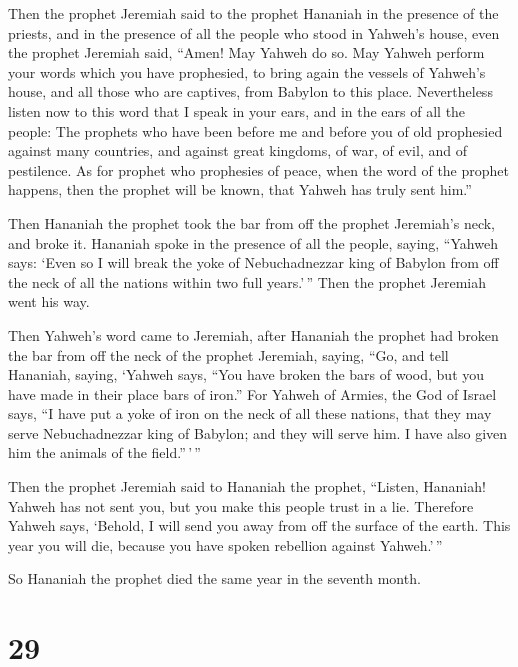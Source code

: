  Then the prophet Jeremiah said to the prophet Hananiah in
the presence of the priests, and in the presence of all the people who
stood in Yahweh's house,  even the prophet Jeremiah said,
``Amen! May Yahweh do so. May Yahweh perform your words which you have
prophesied, to bring again the vessels of Yahweh's house, and all those
who are captives, from Babylon to this place. 
Nevertheless listen now to this word that I speak in your ears, and in
the ears of all the people:  The prophets who have been
before me and before you of old prophesied against many countries, and
against great kingdoms, of war, of evil, and of pestilence.
 As for prophet who prophesies of peace, when the word of
the prophet happens, then the prophet will be known, that Yahweh has
truly sent him.''

 Then Hananiah the prophet took the bar from off the
prophet Jeremiah's neck, and broke it.  Hananiah spoke in
the presence of all the people, saying, ``Yahweh says: `Even so I will
break the yoke of Nebuchadnezzar king of Babylon from off the neck of
all the nations within two full years.'\,'' Then the prophet Jeremiah
went his way.

 Then Yahweh's word came to Jeremiah, after Hananiah the
prophet had broken the bar from off the neck of the prophet Jeremiah,
saying,  ``Go, and tell Hananiah, saying, `Yahweh says,
``You have broken the bars of wood, but you have made in their place
bars of iron.''  For Yahweh of Armies, the God of Israel
says, ``I have put a yoke of iron on the neck of all these nations, that
they may serve Nebuchadnezzar king of Babylon; and they will serve him.
I have also given him the animals of the field.''\,'\,''

 Then the prophet Jeremiah said to Hananiah the prophet,
``Listen, Hananiah! Yahweh has not sent you, but you make this people
trust in a lie.  Therefore Yahweh says, `Behold, I will
send you away from off the surface of the earth. This year you will die,
because you have spoken rebellion against Yahweh.'\,''

 So Hananiah the prophet died the same year in the
seventh month.

\hypertarget{section-28}{%
\section{29}\label{section-28}}


